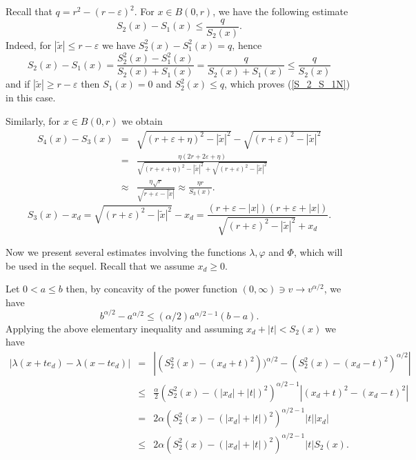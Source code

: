 \documentclass[a4paper,12pt,reqno]{amsart}
\theoremstyle{definition}
\theoremstyle{remark}
\newcommand{\eps}{\varepsilon}
\begin{document}
Recall that $q = r^2 - (r-\eps)^2$.
For  $x \in B(0, r)$, we have the following estimate
\begin{equation} \label{S_2_S_1N}
S_2(x) - S_1(x)\le \frac{q}{S_2(x) }.
\end{equation}
Indeed, for $|\tilde{x} |\le r-\eps$ we have $S^2_2(x) - S^2_1(x)=q$, hence
\begin{equation*}
S_2(x) - S_1(x) = \frac{S^2_2(x) - S^2_1(x)}{S_2(x) + S_1(x)}
= \frac{q}{S_2(x) + S_1(x)}
\le \frac{q}{S_2(x) }
\end{equation*}
and if $|\tilde{x} |\ge r-\eps$ then $S_1(x)=0$ and  $S^2_2(x)\le q$, which proves  (\ref{S_2_S_1N}) in this case.

Similarly, for $x \in B(0, r)$ we obtain
\begin{eqnarray}
\nonumber
S_4(x) - S_3(x) &=&
\sqrt{(r + \eps + \eta)^2 - |\tilde{x}|^2} - \sqrt{(r + \eps)^2 - |\tilde{x}|^2}\\
\nonumber
&=& \frac{\eta (2r+2\eps+\eta)}{\sqrt{(r + \eps + \eta)^2 - |\tilde{x}|^2} + \sqrt{(r + \eps)^2 - |\tilde{x}|^2}}\\
\label{S_4_S_3}
&\approx& \frac{\eta \sqrt{r}}{\sqrt{r + \eps - |\tilde{x}|}}\approx \frac{\eta r}{S_3(x)}.
\end{eqnarray}
\begin{equation}
\label{S_3_x_d}
S_3(x) - x_d =
\sqrt{(r + \eps)^2 - |\tilde{x}|^2} - x_d
= \frac{(r + \eps - |x|)(r + \eps + |x|) }{\sqrt{(r + \eps )^2 - |\tilde{x}|^2} + x_d}.
\end{equation}

Now we present several estimates involving the functions $\lambda, \varphi$ and $\varPhi$, which will be used in the sequel. Recall that we assume $x_d \ge 0$.  

Let $0< a\le b$ then, by concavity of the power function $(0, \infty)\ni v\to v^{\alpha/2}$, we have 
$$ b^{\alpha/2}-a^{\alpha/2}\le (\alpha/2)a^{\alpha/2-1}(b-a).$$
Applying the above elementary inequality and assuming $x_d+ |t |< S_2(x)$  we have 
\begin{eqnarray}    
\left| \lambda(x + te_d ) - \lambda(x - t e_d) \right| &=& |(S^2_2(x)-(x_d+t)^2))^{\alpha/2}-  (S^2_2(x)-(x_d-t)^2)^{\alpha/2}|\nonumber\\
&\le&  \frac\alpha 2 (S^2_2(x)-(|x_d|+|t|)^2)^{\alpha/2-1}|(x_d+t)^2 -(x_d-t)^2|\nonumber \\ 
&=& 2\alpha (S^2_2(x)-(|x_d|+|t|)^2)^{\alpha/2-1}|t||x_d|\nonumber\\ \label{lambda}
&\le& 2\alpha (S^2_2(x)-(|x_d|+|t|)^2)^{\alpha/2-1}|t|S_2(x). 
\end{eqnarray}
\end{document}
